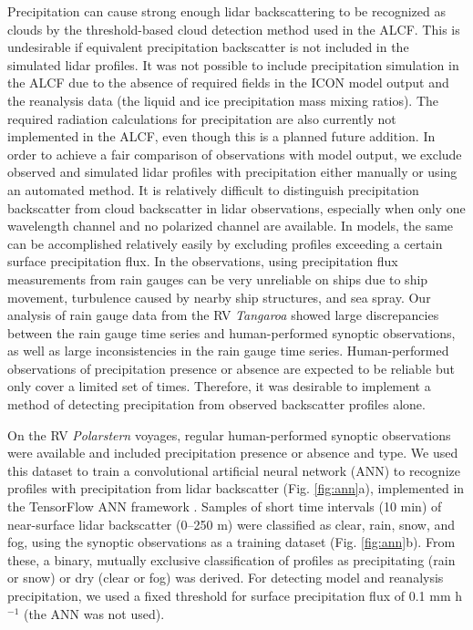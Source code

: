 \documentclass[draft]{agujournal2019}
\begin{document}
Precipitation can cause strong enough lidar backscattering to be recognized as clouds by the threshold-based cloud detection method used in the ALCF. This is undesirable if equivalent precipitation backscatter is not included in the simulated lidar profiles. It was not possible to include precipitation simulation in the ALCF due to the absence of required fields in the ICON model output and the reanalysis data (the liquid and ice precipitation mass mixing ratios). The required radiation calculations for precipitation are also currently not implemented in the ALCF, even though this is a planned future addition. In order to achieve a fair comparison of observations with model output, we exclude observed and simulated lidar profiles with precipitation either manually or using an automated method. It is relatively difficult to distinguish precipitation backscatter from cloud backscatter in lidar observations, especially when only one wavelength channel and no polarized channel are available. In models, the same can be accomplished relatively easily by excluding profiles exceeding a certain surface precipitation flux. In the observations, using precipitation flux measurements from rain gauges can be very unreliable on ships due to ship movement, turbulence caused by nearby ship structures, and sea spray. Our analysis of rain gauge data from the RV \emph{Tangaroa} showed large discrepancies between the rain gauge time series and human-performed synoptic observations, as well as large inconsistencies in the rain gauge time series. Human-performed observations of precipitation presence or absence are expected to be reliable but only cover a limited set of times. Therefore, it was desirable to implement a method of detecting precipitation from observed backscatter profiles alone.

On the RV \emph{Polarstern} voyages, regular human-performed synoptic observations were available and included precipitation presence or absence and type. We used this dataset to train a convolutional artificial neural network (ANN) to recognize profiles with precipitation from lidar backscatter (Fig. \ref{fig:ann}a), implemented in the TensorFlow ANN framework \cite{tensorflow}. Samples of short time intervals (10 min) of near-surface lidar backscatter (0–250 m) were classified as clear, rain, snow, and fog, using the synoptic observations as a training dataset (Fig. \ref{fig:ann}b). From these, a binary, mutually exclusive classification of profiles as precipitating (rain or snow) or dry (clear or fog) was derived. For detecting model and reanalysis precipitation, we used a fixed threshold for surface precipitation flux of 0.1 mm h$^{-1}$ (the ANN was not used).
\end{document}
